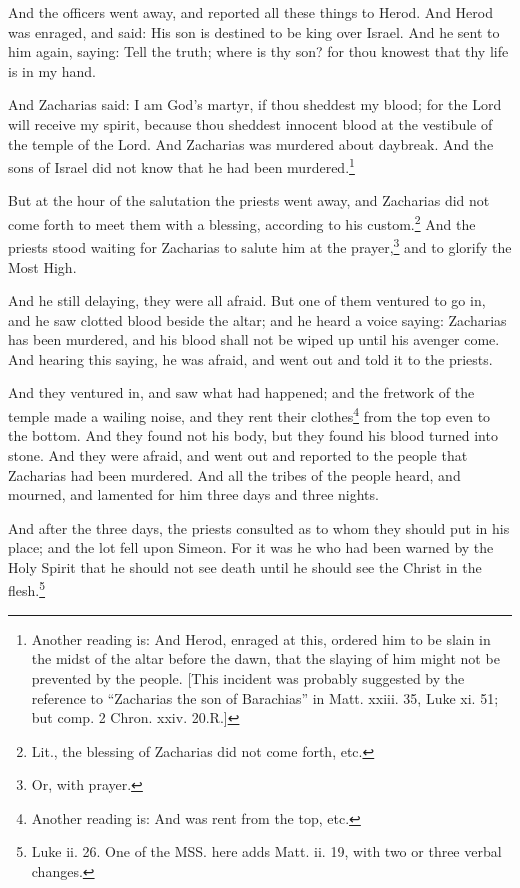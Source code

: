 \pend\pstart
And the officers went away, and reported all these things to Herod. And Herod was enraged, and said: His son is destined to be king over Israel. And he sent to him again, saying: Tell the truth; where is thy son? for thou knowest that thy life is in my hand.

\pend\pstart
And Zacharias said: I am God's martyr, if thou sheddest my blood; for the Lord will receive my spirit, because thou sheddest innocent blood at the vestibule of the temple of the Lord. And Zacharias was murdered about daybreak. And the sons of Israel did not know that he had been murdered.\footnote{Another reading is: And Herod, enraged at this, ordered him to be slain in the midst of the altar before the dawn, that the slaying of him might not be prevented by the people. [This incident was probably suggested by the reference to ``Zacharias the son of Barachias'' in Matt. xxiii. 35, Luke xi. 51; but comp. 2 Chron. xxiv. 20.\textemdash R.]}

\pend\pstart
{}

\pend\pstart
But at the hour of the salutation the priests went away, and Zacharias did not come forth to meet them with a blessing, according to his custom.\footnote{Lit., the blessing of Zacharias did not come forth, etc.} And the priests stood waiting for Zacharias to salute him at the prayer,\footnote{Or, with prayer.} and to glorify the Most High.

\pend\pstart
And he still delaying, they were all afraid. But one of them ventured to go in, and he saw clotted blood beside the altar; and he heard a voice saying: Zacharias has been murdered, and his blood shall not be wiped up until his avenger come. And hearing this saying, he was afraid, and went out and told it to the priests.

\pend\pstart
And they ventured in, and saw what had happened; and the fretwork of the temple made a wailing noise, and they rent their clothes\footnote{Another reading is: And was rent from the top, etc.} from the top even to the bottom. And they found not his body, but they found his blood turned into stone. And they were afraid, and went out and reported to the people that Zacharias had been murdered. And all the tribes of the people heard, and mourned, and lamented for him three days and three nights.

\pend\pstart
And after the three days, the priests consulted as to whom they should put in his place; and the lot fell upon Simeon. For it was he who had been warned by the Holy Spirit that he should not see death until he should see the Christ in the flesh.\footnote{Luke ii. 26. One of the MSS. here adds Matt. ii. 19, with two or three verbal changes.}

